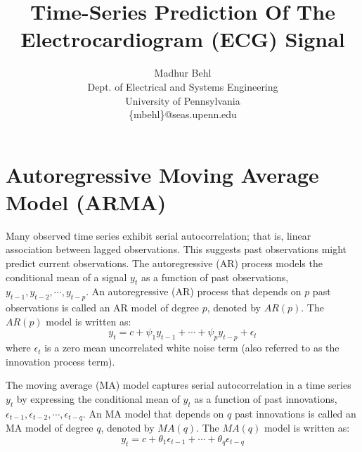 \documentclass[letter, 10pt, journal]{elsarticle}
\theoremstyle{definition}
\begin{document}
%
\title{Time-Series Prediction Of The Electrocardiogram (ECG) Signal}


\author{Madhur Behl\\
Dept. of Electrical and Systems Engineering\\
University of Pennsylvania\\ 	
\{mbehl\}@seas.upenn.edu}


\maketitle


%


%

\section{Autoregressive Moving Average Model (ARMA)}
Many observed time series exhibit serial autocorrelation; that is, linear association between lagged observations. This suggests past observations might predict current observations. The autoregressive (AR) process models the conditional mean of a signal $y_t$ as a function of past observations, $y_{t-1},y_{t-2},\cdots,y_{t-p}$. An autoregressive (AR) process that depends on $p$ past observations is called an AR model of degree $p$, denoted by $AR(p)$. The $AR(p)$ model is written as:
\begin{equation}
y_t = c + \psi_1 y_{t-1} + \cdots + \psi_p y_{t-p} + \epsilon_t
\end{equation}
where $\epsilon_t$ is a zero mean uncorrelated white noise term (also referred to as the innovation process term).

The moving average (MA) model captures serial autocorrelation in a time series $y_t$ by expressing the conditional mean of $y_t$ as a function of past innovations, $\epsilon_{t-1},\epsilon_{t-2},\cdots,\epsilon_{t-q}$. An MA model that depends on $q$ past innovations is called an MA model of degree $q$, denoted by $MA(q)$. The $MA(q)$ model is written as:
\begin{equation}
y_t = c + \theta_1 \epsilon_{t-1} + \cdots + \theta_q \epsilon_{t-q} 
\end{equation}
\end{document}
